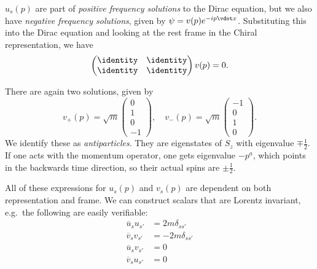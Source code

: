 \documentclass{jknotes} %
\begin{document}
\(u_s(p)\) are part of \emph{positive frequency solutions} to the Dirac equation, but we also have \emph{negative frequency solutions}, given by \(\psi=v(p)e^{-ip\vdot x}\). Substituting this into the Dirac equation and looking at the rest frame in the Chiral representation, we have
\begin{equation}
    \begin{pmatrix}
        \identity & \identity \\ \identity & \identity
    \end{pmatrix}v(p) = 0.
\end{equation}

There are again two solutions, given by
\begin{equation}
    v_+(p) = \sqrt{m}
    \begin{pmatrix}
        0 \\ 1 \\ 0 \\ -1
    \end{pmatrix}
    ,\quad
    v_-(p) = \sqrt{m}
    \begin{pmatrix}
        -1 \\ 0 \\ 1 \\ 0
    \end{pmatrix}.
\end{equation}
We identify these as \emph{antiparticles}. They are eigenstates of \(S_z\) with eigenvalue \(\mp \frac{1}{2}\). If one acts with the momentum operator, one gets eigenvalue \(-p^a\), which points in the backwards time direction, so their actual spins are \(\pm \frac{1}{2}\).

All of these expressions for \(u_s(p)\) and \(v_s(p)\) are dependent on both representation and frame. We can construct scalars that are Lorentz invariant, e.g.\ the following are easily verifiable:
\begin{align}
    \overline{u}_s u_{s'} &= 2m\delta_{ss'} \\
    \overline{v}_s v_{s'} &= -2m\delta_{ss'} \\
    \overline{u}_s v_{s'} &= 0 \\
    \overline{v}_s u_{s'} &= 0
\end{align}
\end{document}
